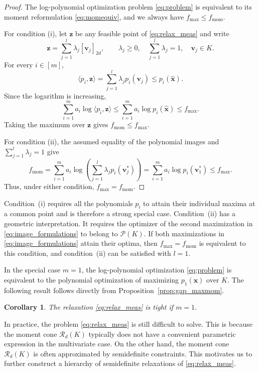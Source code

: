 \documentclass[pdflatex,sn-mathphys-num]{sn-jnl}%
\newcommand{\vect}[1]{\boldsymbol{#1}}
\theoremstyle{thmstyleone}%
\newtheorem{corollary}[theorem]{Corollary}
\theoremstyle{thmstyletwo}%
\theoremstyle{thmstylethree}%
\begin{document}
\begin{proof} 
The log-polynomial optimization problem \eqref{eq:problem} is equivalent to its moment
reformulation \eqref{eq:momequiv}, and we always have
$f_{\max}\leq f_{\operatorname{mom}}$.

For condition (i), let $\vect{z}$ be any feasible point of
\eqref{eq:relax_meas} and write
\[
\vect{z}=\sum_{j=1}^l\lambda_j[\vect{v}_j]_{2d},
\qquad
\lambda_j\geq0,\quad
\sum_{j=1}^l\lambda_j=1,\quad \vect{v}_j\in K.
\]
For every $i\in[m]$,
\[
\langle p_i,\vect{z}\rangle
=\sum_{j=1}^l\lambda_jp_i(\vect{v}_j)
\leq p_i(\vect{\hat{x}}).
\]
Since the logarithm is increasing,
\[
\sum_{i=1}^m a_i\log\langle p_i,\vect{z}\rangle
\leq
\sum_{i=1}^m a_i\log p_i(\vect{\hat{x}})
\leq f_{\max}.
\]
Taking the maximum over $\vect{z}$ gives
$f_{\operatorname{mom}}\leq f_{\max}$.

For condition (ii), the assumed equality of the polynomial images and
$\sum_{j=1}^l\lambda_j=1$ give
\[
f_{\operatorname{mom}}=\sum_{i=1}^m a_i
  \log\left(\sum_{j=1}^l\lambda_jp_i(\vect{v}_j^*)\right)
=\sum_{i=1}^m a_i\log p_i(\vect{v}_1^*)
\leq f_{\max}.
\]
Thus, under either condition,
$f_{\max}=f_{\operatorname{mom}}$. 
\end{proof}


Condition~(i) requires all the polynomials $p_i$ to attain their
individual maxima at a common point and is therefore a strong special
case. Condition~(ii) has a geometric interpretation. It requires the
optimizer of the second maximization in
\eqref{eq:image_formulations} to belong to $\mathcal{P}(K)$. If both
maximizations in \eqref{eq:image_formulations} attain their optima, then
$f_{\max}=f_{\operatorname{mom}}$ is equivalent to this condition, and
condition~(ii) can be satisfied with $l=1$.


In the special case $m=1$,
the log-polynomial optimization \eqref{eq:problem} is equivalent to 
the polynomial optimization of maximizing $p_1(\vect{x})$ over $K$.
The following result follows directly from Proposition~\ref{prop:gap_maxmom}.
\begin{corollary}
	The relaxation \eqref{eq:relax_meas} is tight if $m=1$.
\end{corollary}

In practice, the problem \eqref{eq:relax_meas} is still difficult to solve.
This is because the moment cone $\mathscr{R}_d(K)$ typically 
does not have a convenient parametric expression in the multivariate case.
On the other hand, the moment cone $\mathscr{R}_d(K)$ 
is often approximated by semidefinite constraints.
This motivates us to further construct 
a hierarchy of semidefinite relaxations of \eqref{eq:relax_meas}.
\end{document}
